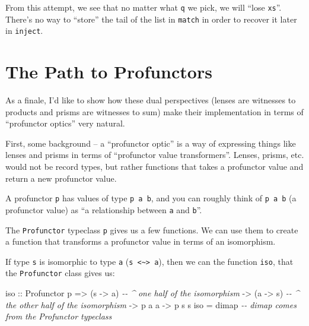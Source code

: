 \documentclass[]{article}
\newenvironment{Shaded}{}{}
\newcommand{\CommentTok}[1]{\textcolor[rgb]{0.38,0.63,0.69}{\textit{#1}}}
\newcommand{\DataTypeTok}[1]{\textcolor[rgb]{0.56,0.13,0.00}{#1}}
\newcommand{\NormalTok}[1]{#1}
\newcommand{\OtherTok}[1]{\textcolor[rgb]{0.00,0.44,0.13}{#1}}
\begin{document}
From this attempt, we see that no matter what \texttt{q} we pick, we will ``lose
\texttt{xs}''. There's no way to ``store'' the tail of the list in
\texttt{match} in order to recover it later in \texttt{inject}.

\hypertarget{the-path-to-profunctors}{%
\section{The Path to Profunctors}\label{the-path-to-profunctors}}

As a finale, I'd like to show how these dual perspectives (lenses are witnesses
to products and prisms are witnesses to sum) make their implementation in terms
of ``profunctor optics'' very natural.

First, some background -- a ``profunctor optic'' is a way of expressing things
like lenses and prisms in terms of ``profunctor value transformers''. Lenses,
prisms, etc. would not be record types, but rather functions that takes a
profunctor value and return a new profunctor value.

A profunctor \texttt{p} has values of type \texttt{p\ a\ b}, and you can roughly
think of \texttt{p\ a\ b} (a profunctor value) as ``a relationship between
\texttt{a} and \texttt{b}''.

The \texttt{Profunctor} typeclass \texttt{p} gives us a few functions. We can
use them to create a function that transforms a profunctor value in terms of an
isomorphism.

If type \texttt{s} is isomorphic to type \texttt{a}
(\texttt{s\ \textless{}\textasciitilde{}\textgreater{}\ a}), then we can the
function \texttt{iso}, that the \texttt{Profunctor} class gives us:

\begin{Shaded}
\begin{Highlighting}[]
\OtherTok{iso ::} \DataTypeTok{Profunctor}\NormalTok{ p}
    \OtherTok{=>}\NormalTok{ (s }\OtherTok{{-}>}\NormalTok{ a)         }\CommentTok{{-}{-} \^{} one half of the isomorphism}
    \OtherTok{{-}>}\NormalTok{ (a }\OtherTok{{-}>}\NormalTok{ s)         }\CommentTok{{-}{-} \^{} the other half of the isomorphism}
    \OtherTok{{-}>}\NormalTok{ p a a}
    \OtherTok{{-}>}\NormalTok{ p s s}
\NormalTok{iso }\OtherTok{=}\NormalTok{ dimap         }\CommentTok{{-}{-} \textasciigrave{}dimap\textasciigrave{} comes from the \textasciigrave{}Profunctor\textasciigrave{} typeclass}
\end{Highlighting}
\end{Shaded}
\end{document}
